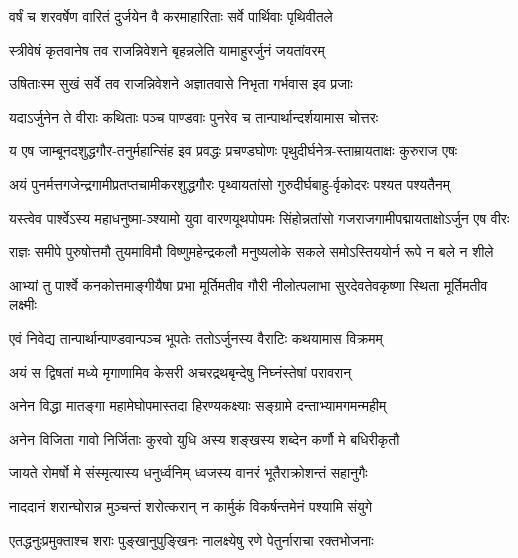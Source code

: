 \twolineshloka
{वर्षं च शरवर्षेण वारितं दुर्जयेन वै}
{करमाहारिताः सर्वे पार्थिवाः पृथिवीतले}


\twolineshloka
{स्त्रीवेषं कृतवानेष तव राजन्निवेशने}
{बृहन्नलेति यामाहुरर्जुनं जयतांवरम्}


\twolineshloka
{उषिताःस्म सुखं सर्वे तव राजन्निवेशने}
{अज्ञातवासे निभृता गर्भवास इव प्रजाः}



\twolineshloka
{यदाऽर्जुनेन ते वीराः कथिताः पञ्च पाण्डवाः}
{पुनरेव च तान्पार्थान्दर्शयामास चोत्तरः}




\twolineshloka
{य एष जाम्बूनदशुद्धगौर-तनुर्महान्सिंह इव प्रवद्धः}
{प्रचण्डघोणः पृथुदीर्घनेत्र-स्ताम्रायताक्षः कुरुराज एषः}


\twolineshloka
{अयं पुनर्मत्तगजेन्द्रगामीप्रतप्तचामीकरशुद्धगौरः}
{पृथ्वायतांसो गुरुदीर्घबाहु-र्वृकोदरः पश्यत पश्यतैनम्}


\twolineshloka
{यस्त्वेव पार्श्वेऽस्य महाधनुष्मा-ञ्श्यामो युवा वारणयूथपोपमः}
{सिंहोन्नतांसो गजराजगामीपद्मायताक्षोऽर्जुन एष वीरः}


\twolineshloka
{राज्ञः समीपे पुरुषोत्तमौ तुयमाविमौ विष्णुमहेन्द्रकलौ}
{मनुष्यलोके सकले समोऽस्तिययोर्न रूपे न बले न शीले}


\twolineshloka
{आभ्यां तु पार्श्वे कनकोत्तमाङ्गीयैषा प्रभा मूर्तिमतीव गौरी}
{नीलोत्पलाभा सुरदेवतेवकृष्णा स्थिता मूर्तिमतीव लक्ष्मीः}



\twolineshloka
{एवं निवेद्य तान्पार्थान्पाण्डवान्पञ्च भूपतेः}
{ततोऽर्जुनस्य वैराटिः कथयामास विक्रमम्}


\twolineshloka
{अयं स द्विषतां मध्ये मृगाणामिव केसरी}
{अचरद्रथबृन्देषु निघ्नंस्तेषां परावरान्}


\twolineshloka
{अनेन विद्धा मातङ्गा महामेघोपमास्तदा}
{हिरण्यकक्ष्याः सङ्ग्रामे दन्ताभ्यामगमन्महीम्}


\twolineshloka
{अनेन विजिता गावो निर्जिताः कुरवो युधि}
{अस्य शङ्खस्य शब्देन कर्णौ मे बधिरीकृतौ}


\twolineshloka
{जायते रोमर्षो मे संस्मृत्यास्य धनुर्ध्वनिम्}
{ध्वजस्य वानरं भूतैराक्रोशन्तं सहानुगैः}


\twolineshloka
{नाददानं शरान्घोरान्न मुञ्चन्तं शरोत्करान्}
{न कार्मुकं विकर्षन्तमेनं पश्यामि संयुगे}


\twolineshloka
{एतद्धनुःप्रमुक्ताश्च शराः पुङ्खानुपुङ्खिनः}
{नालक्ष्येषु रणे पेतुर्नाराचा रक्तभोजनाः}


